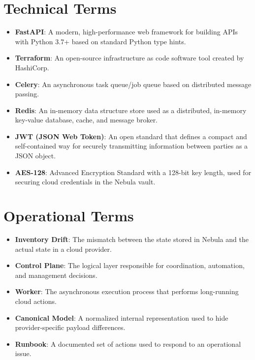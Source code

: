 \section{Technical Terms}
\begin{itemize}
    \item \textbf{FastAPI}: A modern, high-performance web framework for building APIs with Python 3.7+ based on standard Python type hints.
    \item \textbf{Terraform}: An open-source infrastructure as code software tool created by HashiCorp.
    \item \textbf{Celery}: An asynchronous task queue/job queue based on distributed message passing.
    \item \textbf{Redis}: An in-memory data structure store used as a distributed, in-memory key-value database, cache, and message broker.
    \item \textbf{JWT (JSON Web Token)}: An open standard that defines a compact and \\ self-contained way for securely transmitting information between parties as a JSON object.
    \item \textbf{AES-128}: Advanced Encryption Standard with a 128-bit key length, used for securing cloud credentials in the Nebula vault.
\end{itemize}

\section{Operational Terms}
\begin{itemize}
    \item \textbf{Inventory Drift}: The mismatch between the state stored in Nebula and the actual state in a cloud provider.
    \item \textbf{Control Plane}: The logical layer responsible for coordination, automation, and management decisions.
    \item \textbf{Worker}: The asynchronous execution process that performs long-running cloud actions.
    \item \textbf{Canonical Model}: A normalized internal representation used to hide \\ provider-specific payload differences.
    \item \textbf{Runbook}: A documented set of actions used to respond to an operational issue.
\end{itemize}


\newpage
